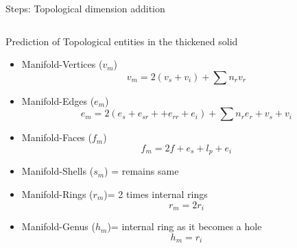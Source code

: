 \begin{frame}{Steps: Topological dimension addition}
\begin{tabular}[htp]{@{}p{0.75\linewidth} p{0.2\linewidth}@{}}
\end{tabular}



	


\end{frame}

\begin{frame}{Prediction of Topological entities in the thickened solid}


\begin{itemize}[noitemsep,label=\textbullet,topsep=2pt,parsep=2pt,partopsep=2pt]
\item Manifold-Vertices  ($v_m$) 
\begin{equation}
v_m = 2 (v_s + v_i) + \sum n_{r} v_{r} \label{eqn_vm}
\end{equation}
\item Manifold-Edges ($e_m$)
\begin{equation}
e_m = 2 (e_s + e_{sr} + + e_{rr} + e_i) + \sum n_r e_r  + v_s + v_i\label{eqn_em}
\end{equation}
\item Manifold-Faces ($f_m$) 
\begin{equation}
f_m = 2f + e_s + l_p + e_i \label{eqn_fm}
\end{equation}
\item Manifold-Shells ($s_m$) = remains same
\item Manifold-Rings ($r_m$)= 2 times internal rings
\begin{equation}
r_m = 2r_i\label{eqn_rm}
\end{equation}
\item Manifold-Genus ($h_m$)= internal ring as it becomes a hole
\begin{equation}
h_m = r_i\label{eqn_hm}
\end{equation}
\end{itemize}
\end{frame}


